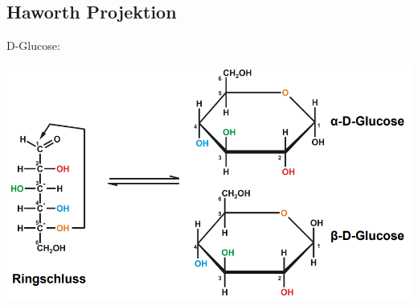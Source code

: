 \subsection{Haworth Projektion}
D-Glucose:

\includegraphics[scale=0.86]{media/naturstoffe/haworth.png}

